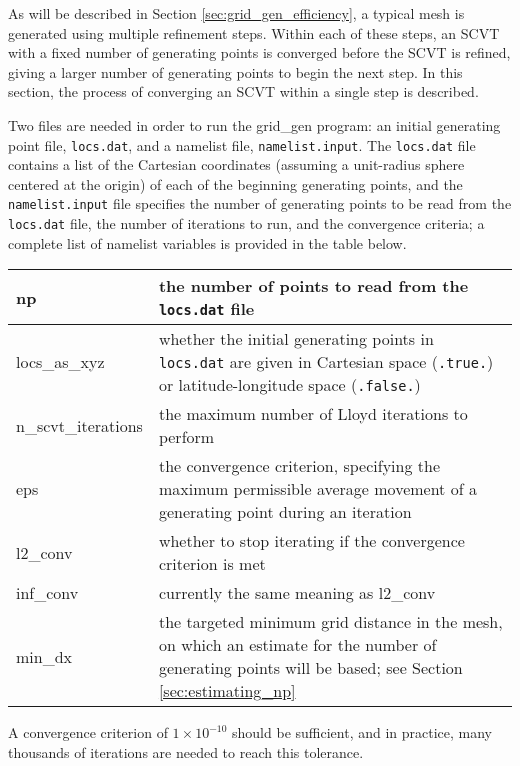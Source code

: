 As will be described in Section \ref{sec:grid_gen_efficiency}, a typical mesh is generated using multiple refinement steps. Within each of these steps, an SCVT with a fixed
number of generating points is converged before the SCVT is refined, giving a larger number of generating points to begin the next step. In this section, the process of converging an SCVT within a single step is described.

Two files are needed in order to run the grid\_gen program: an initial generating point file, {\tt locs.dat}, and a                        
namelist file, {\tt namelist.input}. The {\tt locs.dat} file contains a list of the Cartesian coordinates (assuming a unit-radius sphere
centered at the origin) of each of the beginning generating points, and the {\tt namelist.input} file specifies the number of generating points to be read from the {\tt locs.dat} file, the number of iterations to run, and the convergence criteria; a complete list of namelist variables is provided in the table below.

\vspace{12pt}
\begin{longtable}{|p{1.25in} |p{4.5in}|}
\hline
np & the number of points to read from the {\tt locs.dat} file \\ \hline
locs\_as\_xyz & whether the initial generating points in {\tt locs.dat} are given in Cartesian space ({\tt .true.}) or latitude-longitude space ({\tt .false.}) \\ \hline
n\_scvt\_iterations & the maximum number of Lloyd iterations to perform \\ \hline
eps & the convergence criterion, specifying the maximum permissible average movement of a generating point during an iteration \\ \hline
l2\_conv & whether to stop iterating if the convergence criterion is met \\ \hline
inf\_conv & currently the same meaning as l2\_conv \\ \hline
min\_dx & the targeted minimum grid distance in the mesh, on which an estimate for the number of generating points will be based; see Section \ref{sec:estimating_np} \\ \hline
\end{longtable}
\vspace{12pt}

\noindent A convergence criterion of $1\times10^{-10}$ should be sufficient, and in                     
practice, many thousands of iterations are needed to reach this tolerance.

